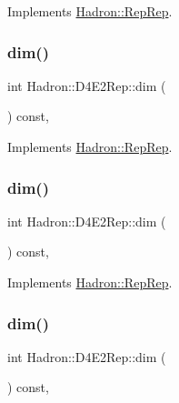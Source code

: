Implements \mbox{\hyperlink{structHadron_1_1RepRep_a92c8802e5ed7afd7da43ccfd5b7cd92b}{Hadron\+::\+Rep\+Rep}}.

\mbox{\label{structHadron_1_1D4E2Rep_a4c70a287724e1537c34e7795797f2f09}} 
\subsubsection{\texorpdfstring{dim()}{dim()}\hspace{0.1cm}{\footnotesize\ttfamily [3/5]}}
{\footnotesize\ttfamily int Hadron\+::\+D4\+E2\+Rep\+::dim (\begin{DoxyParamCaption}{ }\end{DoxyParamCaption}) const\hspace{0.3cm}{\ttfamily [inline]}, {\ttfamily [virtual]}}



Implements \mbox{\hyperlink{structHadron_1_1RepRep_a92c8802e5ed7afd7da43ccfd5b7cd92b}{Hadron\+::\+Rep\+Rep}}.

\mbox{\label{structHadron_1_1D4E2Rep_a4c70a287724e1537c34e7795797f2f09}} 
\subsubsection{\texorpdfstring{dim()}{dim()}\hspace{0.1cm}{\footnotesize\ttfamily [4/5]}}
{\footnotesize\ttfamily int Hadron\+::\+D4\+E2\+Rep\+::dim (\begin{DoxyParamCaption}{ }\end{DoxyParamCaption}) const\hspace{0.3cm}{\ttfamily [inline]}, {\ttfamily [virtual]}}



Implements \mbox{\hyperlink{structHadron_1_1RepRep_a92c8802e5ed7afd7da43ccfd5b7cd92b}{Hadron\+::\+Rep\+Rep}}.

\mbox{\label{structHadron_1_1D4E2Rep_a4c70a287724e1537c34e7795797f2f09}} 
\subsubsection{\texorpdfstring{dim()}{dim()}\hspace{0.1cm}{\footnotesize\ttfamily [5/5]}}
{\footnotesize\ttfamily int Hadron\+::\+D4\+E2\+Rep\+::dim (\begin{DoxyParamCaption}{ }\end{DoxyParamCaption}) const\hspace{0.3cm}{\ttfamily [inline]}, {\ttfamily [virtual]}}



